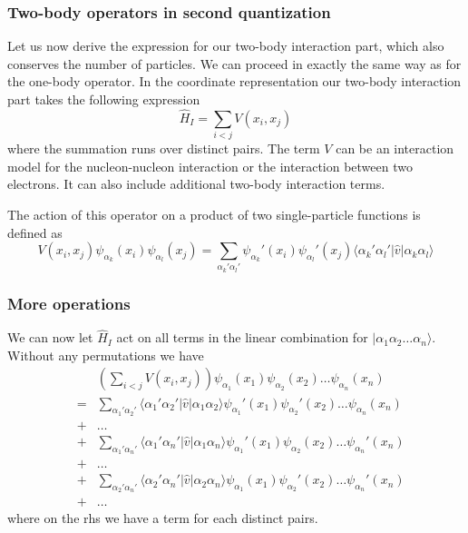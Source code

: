 \documentclass{beamer}
\begin{document}
\begin{frame}
\frametitle{Two-body operators in second quantization}

Let us now derive the expression for our two-body interaction part, which also conserves the number of particles.
We can proceed in exactly the same way as for the one-body operator. In the coordinate representation our
two-body interaction part takes the following expression
\begin{equation}
	\hat{H}_I = \sum_{i < j} V(x_i,x_j) \label{eq:2-31}
\end{equation}
where the summation runs over distinct pairs. The term $V$ can be an interaction model for the nucleon-nucleon interaction
or the interaction between two electrons. It can also include additional two-body interaction terms. 

The action of this operator on a product of 
two single-particle functions is defined as 
\begin{equation}
	V(x_i,x_j) \psi_{\alpha_k}(x_i) \psi_{\alpha_l}(x_j) = \sum_{\alpha_k'\alpha_l'} 
		\psi_{\alpha_k}'(x_i)\psi_{\alpha_l}'(x_j) 
		\langle \alpha_k'\alpha_l'|\hat{v}|\alpha_k\alpha_l\rangle \label{eq:2-32}
\end{equation}
\end{frame}

\begin{frame}
\frametitle{More operations}

We can now let $\hat{H}_I$ act on all terms in the linear combination for $|\alpha_1\alpha_2\dots\alpha_n\rangle$. Without any permutations we have
\begin{align}
	&& \left( \sum_{i < j} V(x_i,x_j) \right) \psi_{\alpha_1}(x_1)\psi_{\alpha_2}(x_2)\dots \psi_{\alpha_n}(x_n) \nonumber \\
	&=& \sum_{\alpha_1'\alpha_2'} \langle \alpha_1'\alpha_2'|\hat{v}|\alpha_1\alpha_2\rangle
		\psi_{\alpha_1}'(x_1)\psi_{\alpha_2}'(x_2)\dots \psi_{\alpha_n}(x_n) \nonumber \\
	& +& \dots \nonumber \\
	&+& \sum_{\alpha_1'\alpha_n'} \langle \alpha_1'\alpha_n'|\hat{v}|\alpha_1\alpha_n\rangle
		\psi_{\alpha_1}'(x_1)\psi_{\alpha_2}(x_2)\dots \psi_{\alpha_n}'(x_n) \nonumber \\
	& +& \dots \nonumber \\
	&+& \sum_{\alpha_2'\alpha_n'} \langle \alpha_2'\alpha_n'|\hat{v}|\alpha_2\alpha_n\rangle
		\psi_{\alpha_1}(x_1)\psi_{\alpha_2}'(x_2)\dots \psi_{\alpha_n}'(x_n) \nonumber \\
	 & +& \dots \label{eq:2-33}
\end{align}
where on the rhs we have a term for each distinct pairs.
\end{frame}
\end{document}
